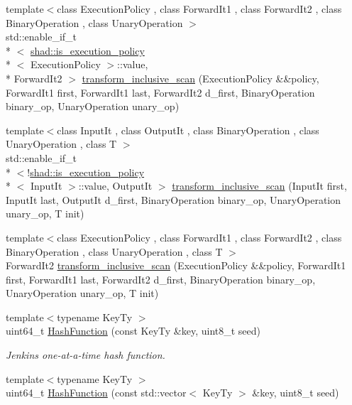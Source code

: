 \begin{DoxyCompactItemize}
{\footnotesize template$<$class Execution\-Policy , class Forward\-It1 , class Forward\-It2 , class Binary\-Operation , class Unary\-Operation $>$ }\\std\-::enable\-\_\-if\-\_\-t\\*
$<$ \hyperlink{structshad_1_1is__execution__policy}{shad\-::is\-\_\-execution\-\_\-policy}\\*
$<$ Execution\-Policy $>$\-::value, \\*
Forward\-It2 $>$ \hyperlink{namespaceshad_a0d3e58f6b91d06bf7d3f46e7d2e478bc}{transform\-\_\-inclusive\-\_\-scan} (Execution\-Policy \&\&policy, Forward\-It1 first, Forward\-It1 last, Forward\-It2 d\-\_\-first, Binary\-Operation binary\-\_\-op, Unary\-Operation unary\-\_\-op)
\item 
{\footnotesize template$<$class Input\-It , class Output\-It , class Binary\-Operation , class Unary\-Operation , class T $>$ }\\std\-::enable\-\_\-if\-\_\-t\\*
$<$!\hyperlink{structshad_1_1is__execution__policy}{shad\-::is\-\_\-execution\-\_\-policy}\\*
$<$ Input\-It $>$\-::value, Output\-It $>$ \hyperlink{namespaceshad_aa7967d1c57c2457d65e5a8dc09b98c0e}{transform\-\_\-inclusive\-\_\-scan} (Input\-It first, Input\-It last, Output\-It d\-\_\-first, Binary\-Operation binary\-\_\-op, Unary\-Operation unary\-\_\-op, T init)
\item 
{\footnotesize template$<$class Execution\-Policy , class Forward\-It1 , class Forward\-It2 , class Binary\-Operation , class Unary\-Operation , class T $>$ }\\Forward\-It2 \hyperlink{namespaceshad_a7731b3ca77801af3286844f6db55364c}{transform\-\_\-inclusive\-\_\-scan} (Execution\-Policy \&\&policy, Forward\-It1 first, Forward\-It1 last, Forward\-It2 d\-\_\-first, Binary\-Operation binary\-\_\-op, Unary\-Operation unary\-\_\-op, T init)
\item 
{\footnotesize template$<$typename Key\-Ty $>$ }\\uint64\-\_\-t \hyperlink{namespaceshad_a21c73a78973e58a8ed4a246a74bff5b9}{Hash\-Function} (const Key\-Ty \&key, uint8\-\_\-t seed)
\begin{DoxyCompactList}\small\item\em Jenkins one-\/at-\/a-\/time hash function. \end{DoxyCompactList}\item 
{\footnotesize template$<$typename Key\-Ty $>$ }\\uint64\-\_\-t \hyperlink{namespaceshad_a1bce4c68f2c688517fdc5dca70da59da}{Hash\-Function} (const std\-::vector$<$ Key\-Ty $>$ \&key, uint8\-\_\-t seed)

\end{DoxyCompactItemize}
